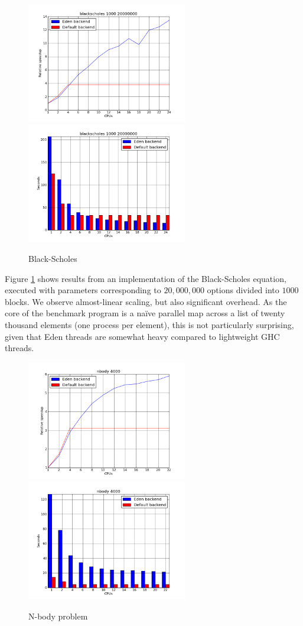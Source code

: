 \documentclass[a4paper, oneside, final]{article}
\begin{document}
\begin{figure}
\caption{Black-Scholes}
\label{fig:blackscholes}
\includegraphics[width=7cm]{blackscholes-speedup.png}
\includegraphics[width=7cm]{blackscholes-runtimes.png}
\end{figure}

Figure \ref{fig:blackscholes} shows results from an implementation of
the Black-Scholes equation, executed with parameters corresponding to
$20,000,000$ options divided into $1000$ blocks.  We observe
almost-linear scaling, but also significant overhead.  As the core of
the benchmark program is a naïve parallel map across a list of twenty
thousand elements (one process per element), this is not particularly
surprising, given that Eden threads are somewhat heavy compared to
lightweight GHC threads.

\begin{figure}
\caption{N-body problem}
\label{fig:nbody}
\includegraphics[width=7cm]{nbody-speedup.png}
\includegraphics[width=7cm]{nbody-runtimes.png}
\end{figure}
\end{document}

